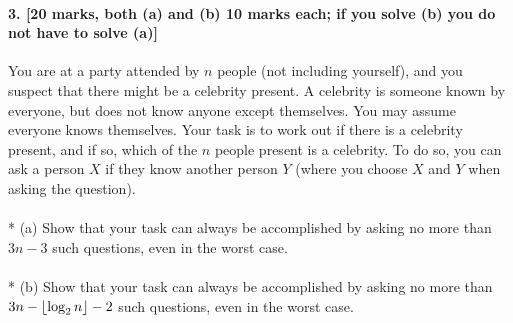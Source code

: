 \documentclass[a4paper]{scrartcl}
\begin{document}
\paragraph{3. [20 marks, both (a) and (b) 10 marks each; if you solve (b) you do not have to
solve (a)]}
\label{sec:Question 3}
You are at a party attended by $n$ people (not including yourself), and you suspect that there might be a celebrity present. A celebrity is someone known by everyone, but does not know anyone except themselves. You may assume everyone knows themselves. Your task is to work out if there is a celebrity present, and if so, which of the $n$ people present is a celebrity. To do so, you can ask a person $X$ if they know another person $Y$ (where you choose $X$ and $Y$ when asking the question).\\
\\*
(a) Show that your task can always be accomplished by asking no more than $3n-3$ such questions, even in the worst case.\\
\\*
(b) Show that your task can always be accomplished by asking no more than $3n-\left\lfloor \log_2{n} \right\rfloor-2$ such questions, even in the worst case.
\end{document}
